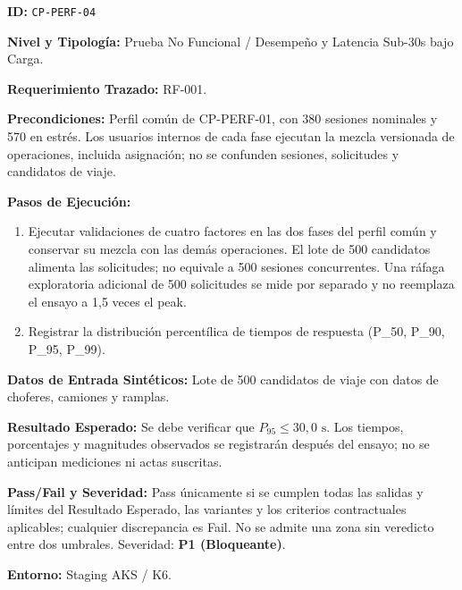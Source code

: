 \par\noindent \textbf{ID:} \texttt{CP-\allowbreak{}PERF-\allowbreak{}04}\par
\par\noindent \textbf{Nivel y Tipología:} Prueba No Funcional / Desempeño y Latencia Sub-30s bajo Carga.\par
\par\noindent \textbf{Requerimiento Trazado:} RF-001.\par
\par\noindent \textbf{Precondiciones:} Perfil común de CP-PERF-01, con 380 sesiones nominales y 570 en estrés. Los usuarios internos de cada fase ejecutan la mezcla versionada de operaciones, incluida asignación; no se confunden sesiones, solicitudes y candidatos de viaje.\par
\par\noindent \textbf{Pasos de Ejecución:}\par
\begin{enumerate}
\item Ejecutar validaciones de cuatro factores en las dos fases del perfil común y conservar su mezcla con las demás operaciones. El lote de 500 candidatos alimenta las solicitudes; no equivale a 500 sesiones concurrentes. Una ráfaga exploratoria adicional de 500 solicitudes se mide por separado y no reemplaza el ensayo a 1,5 veces el peak.
\item Registrar la distribución percentílica de tiempos de respuesta (P\_{50}, P\_{90}, P\_{95}, P\_{99}).
\end{enumerate}

\par\noindent \textbf{Datos de Entrada Sintéticos:} Lote de 500 candidatos de viaje con datos de choferes, camiones y ramplas.\par
\par\noindent \textbf{Resultado Esperado:} Se debe verificar que $P_{95} \le 30{,}0\text{ s}$. Los tiempos, porcentajes y magnitudes observados se registrarán después del ensayo; no se anticipan mediciones ni actas suscritas.\par
\par\noindent \textbf{Pass/Fail y Severidad:} Pass únicamente si se cumplen todas las salidas y límites del Resultado Esperado, las variantes y los criterios contractuales aplicables; cualquier discrepancia es Fail. No se admite una zona sin veredicto entre dos umbrales. Severidad: \textbf{P1 (Bloqueante)}.\par
\par\noindent \textbf{Entorno:} Staging AKS / K6.\par



